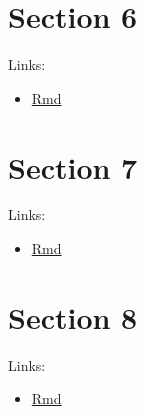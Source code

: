 \documentclass[
  oneside]{book}
\providecommand{\tightlist}{%
  \setlength{\itemsep}{0pt}\setlength{\parskip}{0pt}}
\begin{document}
\hypertarget{section-6}{%
\section{Section 6}\label{section-6}}

Links:

\begin{itemize}
\tightlist
\item
  \href{06-3-ex-sol-ADHD.Rmd}{Rmd}
\end{itemize}

\hypertarget{section-7}{%
\section{Section 7}\label{section-7}}

Links:

\begin{itemize}
\tightlist
\item
  \href{07-3-ex-sol-ADHD.Rmd}{Rmd}
\end{itemize}

\hypertarget{section-8}{%
\section{Section 8}\label{section-8}}

Links:

\begin{itemize}
\tightlist
\item
  \href{08-5-ex-sol-ADHD.Rmd}{Rmd}
\end{itemize}

  
\end{document}
